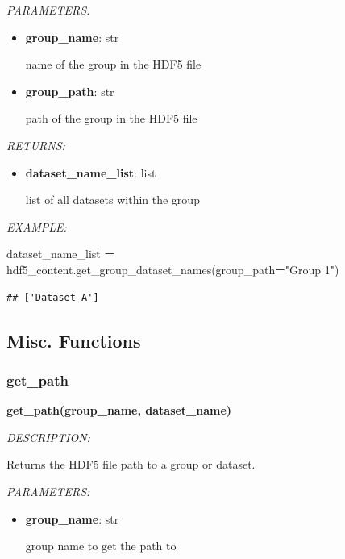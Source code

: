 \documentclass[
]{article}
\newenvironment{Shaded}{\begin{snugshade}}{\end{snugshade}}
\newcommand{\NormalTok}[1]{#1}
\newcommand{\OperatorTok}[1]{\textcolor[rgb]{0.81,0.36,0.00}{\textbf{#1}}}
\newcommand{\StringTok}[1]{\textcolor[rgb]{0.31,0.60,0.02}{#1}}
\begin{document}
\emph{PARAMETERS:}

\begin{itemize}
\item
  \textbf{group\_name}: str

  name of the group in the HDF5 file
\item
  \textbf{group\_path}: str

  path of the group in the HDF5 file
\end{itemize}

\emph{RETURNS:}

\begin{itemize}
\item
  \textbf{dataset\_name\_list}: list

  list of all datasets within the group
\end{itemize}

\emph{EXAMPLE:}

\begin{Shaded}
\begin{Highlighting}[]
\NormalTok{dataset_name_list }\OperatorTok{=}\NormalTok{ hdf5_content.get_group_dataset_names(group_path}\OperatorTok{=}\StringTok{"Group 1"}\NormalTok{)}
\end{Highlighting}
\end{Shaded}

\begin{verbatim}
## ['Dataset A']
\end{verbatim}

\hypertarget{misc.-functions}{%
\subsection{Misc. Functions}\label{misc.-functions}}

\hypertarget{get_path}{%
\subsubsection{get\_path}\label{get_path}}

\textbf{get\_path(group\_name, dataset\_name)}

\emph{DESCRIPTION:}

Returns the HDF5 file path to a group or dataset.

\emph{PARAMETERS:}

\begin{itemize}
\item
  \textbf{group\_name}: str

  group name to get the path to
\end{itemize}
\end{document}
